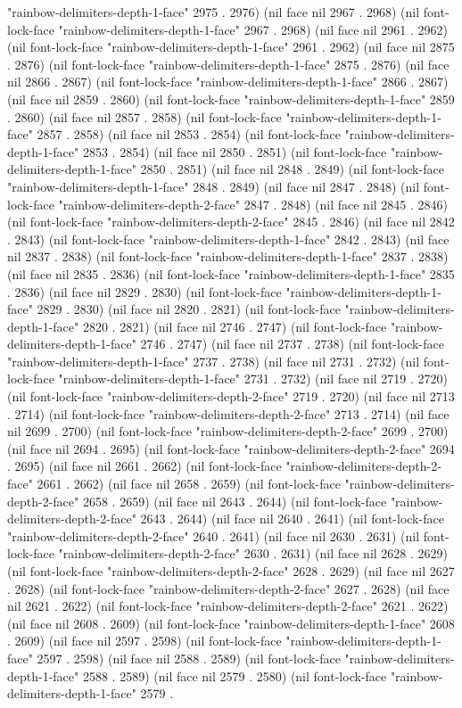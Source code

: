 "rainbow-delimiters-depth-1-face" 2975 . 2976) (nil face nil 2967 . 2968) (nil font-lock-face "rainbow-delimiters-depth-1-face" 2967 . 2968) (nil face nil 2961 . 2962) (nil font-lock-face "rainbow-delimiters-depth-1-face" 2961 . 2962) (nil face nil 2875 . 2876) (nil font-lock-face "rainbow-delimiters-depth-1-face" 2875 . 2876) (nil face nil 2866 . 2867) (nil font-lock-face "rainbow-delimiters-depth-1-face" 2866 . 2867) (nil face nil 2859 . 2860) (nil font-lock-face "rainbow-delimiters-depth-1-face" 2859 . 2860) (nil face nil 2857 . 2858) (nil font-lock-face "rainbow-delimiters-depth-1-face" 2857 . 2858) (nil face nil 2853 . 2854) (nil font-lock-face "rainbow-delimiters-depth-1-face" 2853 . 2854) (nil face nil 2850 . 2851) (nil font-lock-face "rainbow-delimiters-depth-1-face" 2850 . 2851) (nil face nil 2848 . 2849) (nil font-lock-face "rainbow-delimiters-depth-1-face" 2848 . 2849) (nil face nil 2847 . 2848) (nil font-lock-face "rainbow-delimiters-depth-2-face" 2847 . 2848) (nil face nil 2845 . 2846) (nil font-lock-face "rainbow-delimiters-depth-2-face" 2845 . 2846) (nil face nil 2842 . 2843) (nil font-lock-face "rainbow-delimiters-depth-1-face" 2842 . 2843) (nil face nil 2837 . 2838) (nil font-lock-face "rainbow-delimiters-depth-1-face" 2837 . 2838) (nil face nil 2835 . 2836) (nil font-lock-face "rainbow-delimiters-depth-1-face" 2835 . 2836) (nil face nil 2829 . 2830) (nil font-lock-face "rainbow-delimiters-depth-1-face" 2829 . 2830) (nil face nil 2820 . 2821) (nil font-lock-face "rainbow-delimiters-depth-1-face" 2820 . 2821) (nil face nil 2746 . 2747) (nil font-lock-face "rainbow-delimiters-depth-1-face" 2746 . 2747) (nil face nil 2737 . 2738) (nil font-lock-face "rainbow-delimiters-depth-1-face" 2737 . 2738) (nil face nil 2731 . 2732) (nil font-lock-face "rainbow-delimiters-depth-1-face" 2731 . 2732) (nil face nil 2719 . 2720) (nil font-lock-face "rainbow-delimiters-depth-2-face" 2719 . 2720) (nil face nil 2713 . 2714) (nil font-lock-face "rainbow-delimiters-depth-2-face" 2713 . 2714) (nil face nil 2699 . 2700) (nil font-lock-face "rainbow-delimiters-depth-2-face" 2699 . 2700) (nil face nil 2694 . 2695) (nil font-lock-face "rainbow-delimiters-depth-2-face" 2694 . 2695) (nil face nil 2661 . 2662) (nil font-lock-face "rainbow-delimiters-depth-2-face" 2661 . 2662) (nil face nil 2658 . 2659) (nil font-lock-face "rainbow-delimiters-depth-2-face" 2658 . 2659) (nil face nil 2643 . 2644) (nil font-lock-face "rainbow-delimiters-depth-2-face" 2643 . 2644) (nil face nil 2640 . 2641) (nil font-lock-face "rainbow-delimiters-depth-2-face" 2640 . 2641) (nil face nil 2630 . 2631) (nil font-lock-face "rainbow-delimiters-depth-2-face" 2630 . 2631) (nil face nil 2628 . 2629) (nil font-lock-face "rainbow-delimiters-depth-2-face" 2628 . 2629) (nil face nil 2627 . 2628) (nil font-lock-face "rainbow-delimiters-depth-2-face" 2627 . 2628) (nil face nil 2621 . 2622) (nil font-lock-face "rainbow-delimiters-depth-2-face" 2621 . 2622) (nil face nil 2608 . 2609) (nil font-lock-face "rainbow-delimiters-depth-1-face" 2608 . 2609) (nil face nil 2597 . 2598) (nil font-lock-face "rainbow-delimiters-depth-1-face" 2597 . 2598) (nil face nil 2588 . 2589) (nil font-lock-face "rainbow-delimiters-depth-1-face" 2588 . 2589) (nil face nil 2579 . 2580) (nil font-lock-face "rainbow-delimiters-depth-1-face" 2579 . 